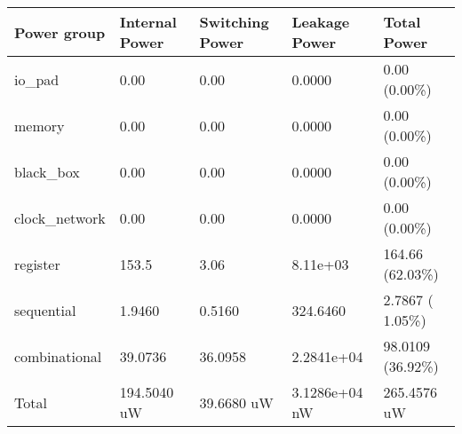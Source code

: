 \begin{tabular}{|lllll|}
\hline
\textbf{Power group} &               \textbf{Internal Power}    &     \textbf{Switching Power}    &      \textbf{Leakage Power}      &     \textbf{Total Power}\\\hline
io\_pad            & 0.00         &   0.00 &           0.0000         &   0.00 (0.00\%)\\
memory            & 0.00        &    0.00  &          0.0000        &    0.00 (0.00\%)\\
black\_box         & 0.00       &     0.00   &         0.0000       &     0.00 (0.00\%)\\
clock\_network     & 0.00      &      0.00   &        0.0000      &      0.00 (0.00\%)\\
register         & 153.5     &      3.06     &   8.11e+03     &     164.66 (62.03\%)\\
sequential       & 1.9460        &    0.5160      &    324.6460       &     2.7867  ( 1.05\%)\\
combinational    &   39.0736       &    36.0958  &  2.2841e+04    &    98.0109  (36.92\%)\\
\hline
Total         & 194.5040 uW     &   39.6680 uW   &  3.1286e+04 nW    &   265.4576 uW \\\hline
\end{tabular}